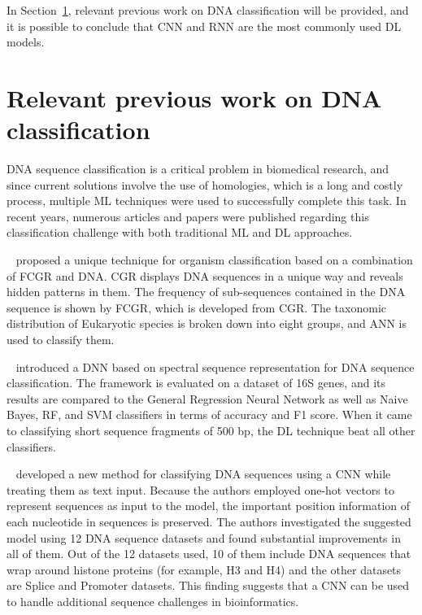 In Section~\ref{sec:previous_work}, relevant previous work on DNA classification will be provided, and it is possible to conclude that \gls{CNN} and \gls{RNN} are the most commonly used \gls{DL} models.

\section{Relevant previous work on DNA classification}\label{sec:previous_work}

\gls{DNA} sequence classification is a critical problem in biomedical research, and since current solutions involve the use of homologies, which is a long and costly process, multiple \gls{ML} techniques were used to successfully complete this task. In recent years, numerous articles and papers were published regarding this classification challenge with both traditional \gls{ML} and \gls{DL} approaches.

\citeauthor{Nair2010ANNRepresentation}~\cite{Nair2010ANNRepresentation} proposed a unique technique for organism classification based on a combination of \gls{FCGR} and \gls{DNA}. \gls{CGR} displays \gls{DNA} sequences in a unique way and reveals hidden patterns in them. The frequency of sub-sequences contained in the \gls{DNA} sequence is shown by \gls{FCGR}, which is developed from \gls{CGR}. The taxonomic distribution of Eukaryotic species is broken down into eight groups, and \gls{ANN} is used to classify them.

\citeauthor{Rizzo2015AClassification}~\cite{Rizzo2015AClassification} introduced a \gls{DNN} based on spectral sequence representation for \gls{DNA} sequence classification. The framework is evaluated on a dataset of 16S genes, and its results are compared to the General Regression Neural Network as well as Naive Bayes, \gls{RF}, and \gls{SVM} classifiers in terms of accuracy and F1 score. When it came to classifying short sequence fragments of 500 bp, the \gls{DL} technique beat all other classifiers.

\citeauthor{Nguyen2016DNANetwork}~\cite{Nguyen2016DNANetwork} developed a new method for classifying \gls{DNA} sequences using a \gls{CNN} while treating them as text input. Because the authors employed one-hot vectors to represent sequences as input to the model, the important position information of each nucleotide in sequences is preserved. The authors investigated the suggested model using 12 \gls{DNA} sequence datasets and found substantial improvements in all of them. Out of the 12 datasets used, 10 of them include DNA sequences that wrap around histone proteins (for example, H3 and H4) and the other datasets are Splice and Promoter datasets. This finding suggests that a \gls{CNN} can be used to handle additional sequence challenges in bioinformatics.

